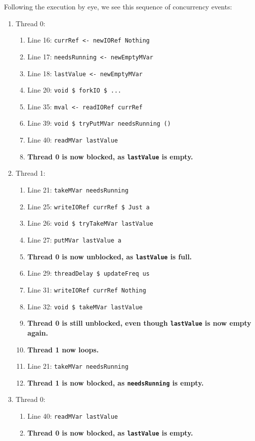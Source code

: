 Following the execution by eye, we see this sequence of concurrency
events:

\begin{enumerate}
\item Thread 0:
  \begin{enumerate}
  \item Line 16: \verb|currRef <- newIORef Nothing|
  \item Line 17: \verb|needsRunning <- newEmptyMVar|
  \item Line 18: \verb|lastValue <- newEmptyMVar|
  \item Line 20: \verb|void $ forkIO $ ...|
  \item Line 35: \verb|mval <- readIORef currRef|
  \item Line 39: \verb|void $ tryPutMVar needsRunning ()|
  \item Line 40: \verb|readMVar lastValue|
  \item \textbf{Thread 0 is now blocked, as \texttt{lastValue} is empty.}
  \end{enumerate}
\item Thread 1:
  \begin{enumerate}
  \item Line 21: \verb|takeMVar needsRunning|
  \item Line 25: \verb|writeIORef currRef $ Just a|
  \item Line 26: \verb|void $ tryTakeMVar lastValue|
  \item Line 27: \verb|putMVar lastValue a|
  \item \textbf{Thread 0 is now unblocked, as \texttt{lastValue} is full.}
  \item Line 29: \verb|threadDelay $ updateFreq us|
  \item Line 31: \verb|writeIORef currRef Nothing|
  \item Line 32: \verb|void $ takeMVar lastValue|
  \item \textbf{Thread 0 is still unblocked, even though \texttt{lastValue} is now empty again.}
  \item \textbf{Thread 1 now loops.}
  \item Line 21: \verb|takeMVar needsRunning|
  \item \textbf{Thread 1 is now blocked, as \texttt{needsRunning} is empty.}
  \end{enumerate}
\item Thread 0:
  \begin{enumerate}
  \item Line 40: \verb|readMVar lastValue|
  \item \textbf{Thread 0 is now blocked, as \texttt{lastValue} is empty.}
  \end{enumerate}
\end{enumerate}

